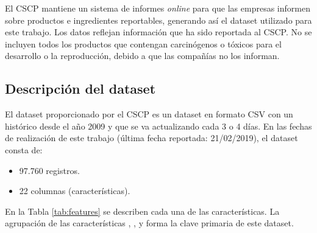 El CSCP mantiene un sistema de informes \textit{online} para que las empresas informen sobre productos e ingredientes reportables, generando así el dataset utilizado para este trabajo. Los datos reflejan información que ha sido reportada al CSCP. No se incluyen todos los productos que contengan carcinógenos o tóxicos para el desarrollo o la reproducción, debido a que las compañías no los informan.



\subsection{Descripción del dataset}

El dataset proporcionado por el CSCP es un dataset en formato CSV con un histórico desde el año 2009 y que se va actualizando cada 3 o 4 días. En las fechas de realización de este trabajo (última fecha reportada: 21/02/2019), el dataset consta de:

\begin{itemize}
 \item 97.760 registros.
 \item 22 columnas (características).
\end{itemize}

En la Tabla \ref{tab:features} se describen cada una de las características. La agrupación de las características , ,  y  forma la clave primaria de este dataset.

